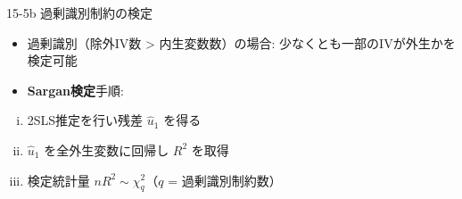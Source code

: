 \documentclass[
  ignorenonframetext,
]{beamer}
\providecommand{\tightlist}{%
  \setlength{\itemsep}{0pt}\setlength{\parskip}{0pt}}
\begin{document}
\begin{frame}{15-5b 過剰識別制約の検定}
\label{b-ux904eux5270ux8b58ux5225ux5236ux7d04ux306eux691cux5b9a}
\begin{itemize}
\tightlist
\item
  過剰識別（除外IV数 \textgreater{} 内生変数数）の場合:
  少なくとも一部のIVが外生かを検定可能
\item
  \textbf{Sargan検定}手順:
\end{itemize}

\begin{enumerate}
[(i)]
\item
  2SLS推定を行い残差 \(\hat{u}_1\) を得る
\item
  \(\hat{u}_1\) を全外生変数に回帰し \(R^2\) を取得
\item
  検定統計量 \(nR^2 \sim \chi^2_q\)（\(q\) = 過剰識別制約数）
\end{enumerate}
\end{frame}
\end{document}
